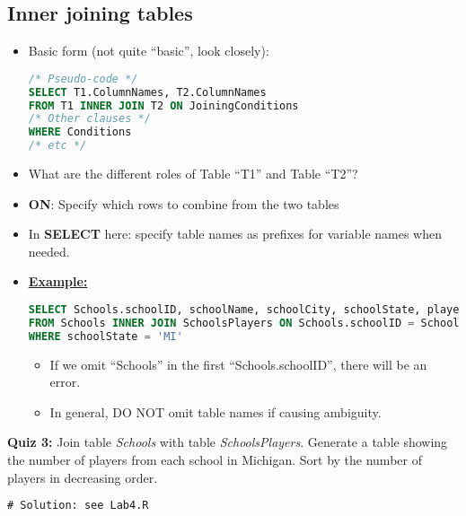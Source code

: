 \documentclass[12pt]{article}
\begin{document}
\subsection{Inner joining tables}
\begin{itemize}
	\item Basic form (not quite ``basic'', look closely):
\begin{lstlisting}[style=displaycode, language=SQL]
/* Pseudo-code */
SELECT T1.ColumnNames, T2.ColumnNames
FROM T1 INNER JOIN T2 ON JoiningConditions
/* Other clauses */
WHERE Conditions
/* etc */
\end{lstlisting}
	\item What are the different roles of Table ``T1'' and Table ``T2''?
	\item {\bf ON}: Specify which rows to combine from the two tables
	\item In {\bf SELECT} here: specify table names as prefixes for variable names when needed.
	\item \underline{\bf Example:}
\begin{lstlisting}[style=displaycode, language=SQL]
SELECT Schools.schoolID, schoolName, schoolCity, schoolState, playerID
FROM Schools INNER JOIN SchoolsPlayers ON Schools.schoolID = SchoolsPlayers.schoolID
WHERE schoolState = 'MI'
\end{lstlisting}
\begin{itemize}[label=*]
\item If we omit ``Schools'' in the first ``Schools.schoolID'', there will be an error.
\item In general, DO NOT omit table names if causing ambiguity.
\end{itemize}
\end{itemize}
{\bf Quiz 3:} Join table \emph{Schools} with table \emph{SchoolsPlayers}. Generate a table showing the number of players from each school in Michigan. Sort by the number of players in decreasing order.

\begin{lstlisting}[style=displaycode, language=SQL]
# Solution: see Lab4.R
\end{lstlisting}
\end{document}
